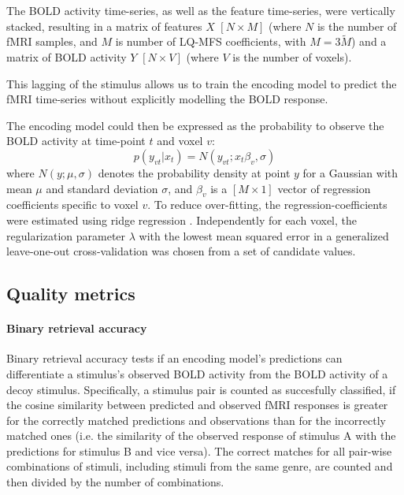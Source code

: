 The BOLD activity time-series, as well as the feature time-series, were
vertically stacked, resulting in a matrix of features $X$ $[N\times M]$ (where $N$ is
the number of f{MRI} samples, and $M$ is number of LQ-MFS coefficients, with
$M=3\widetilde{M}$) and a matrix of BOLD activity $Y$ $[N\times V]$ (where $V$ is
the number of voxels).

This lagging of the stimulus allows us to train the encoding model to predict
the f{MRI} time-series without explicitly modelling the BOLD response.

The encoding model could then be expressed as the probability to observe the BOLD activity at time-point $t$ and voxel $v$:
%
\begin{equation}
  \label{eq:encmo}
  p(y_{vt}|x_{t}) = N(y_{vt};x_{t}\beta_{v},\sigma)
\end{equation}
%
where $N(y;\mu,\sigma)$ denotes the probability density at point $y$ for a
Gaussian with mean $\mu$ and standard deviation $\sigma$, and $\beta_{v}$ is a
$[M\times1]$ vector of regression coefficients specific to voxel $v$. To reduce
over-fitting, the regression-coefficients were estimated using ridge regression
\citep{HK70}.  Independently for each voxel, the regularization parameter
$\lambda$ with the lowest mean squared error in a generalized leave-one-out
cross-validation \citep{GHW79} was chosen from a set of candidate values.

\subsection*{Quality metrics} 

\paragraph{Binary retrieval accuracy}

Binary retrieval accuracy \citep{ML08} tests if an encoding model's predictions
can differentiate a stimulus's observed BOLD activity from the BOLD activity
of a decoy stimulus.
Specifically, a stimulus pair is counted as succesfully classified, if the cosine similarity between predicted and
observed f{MRI} responses is greater for the correctly matched predictions and
observations than for the incorrectly matched ones (i.e. the similarity of the observed response of
stimulus A with the predictions for stimulus B and vice versa).
The correct matches for all pair-wise combinations of stimuli, including stimuli from the
same genre, are counted and then divided by the number of combinations.

